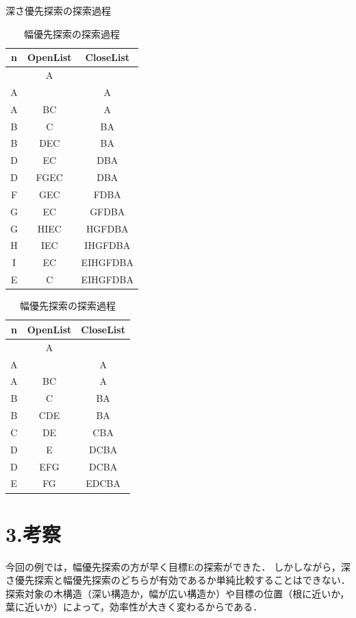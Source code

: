 \documentclass[12pt,dvipdfmx]{jarticle}
\begin{document}
\begin{table}
	\begin{minipage}{0.5\textwidth}
		\centering
		\caption{深さ優先探索の探索過程}
		\label{table:02}
		\begin{tabular}{|c|c|c|}
			\hline
			n & OpenList &  CloseList \\ \hline
 			& A &  \\ \hline
			A &  & A \\ \hline
			A & BC & A \\ \hline
			B & C & BA \\ \hline
			B & DEC & BA \\ \hline
			D & EC & DBA \\ \hline
			D & FGEC & DBA \\ \hline
			F & GEC & FDBA \\ \hline
			G & EC & GFDBA \\ \hline
			G & HIEC & HGFDBA \\ \hline
			H & IEC & IHGFDBA \\ \hline
			I & EC & EIHGFDBA \\ \hline
			E & C & EIHGFDBA \\ \hline
 		\end{tabular}
	\end{minipage}
	\begin{minipage}{0.5\textwidth}
		\centering
		\caption{幅優先探索の探索過程}
		\label{table:03}
		\begin{tabular}{|c|c|c|}
			\hline
			 n & OpenList &  CloseList \\ \hline
			 & A &  \\ \hline
			A &  & A \\ \hline
			A & BC & A \\ \hline
			B & C & BA \\ \hline
			B & CDE & BA \\ \hline
			C & DE & CBA \\ \hline
			D & E & DCBA \\ \hline
			D & EFG & DCBA \\ \hline
			E & FG & EDCBA \\ \hline
		\end{tabular}
	\end{minipage}
 \end{table}

\vspace{-1cm}
\section*{3.考察}
今回の例では，幅優先探索の方が早く目標Eの探索ができた．
しかしながら，深さ優先探索と幅優先探索のどちらが有効であるか単純比較することはできない．
探索対象の木構造（深い構造か，幅が広い構造か）や目標の位置（根に近いか，葉に近いか）によって，効率性が大きく変わるからである．
\end{document}
